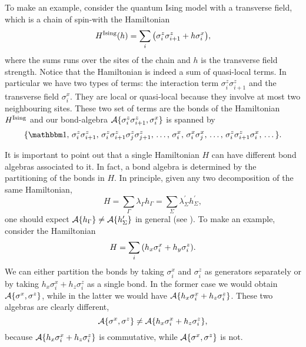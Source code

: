 To make an example, consider the quantum Ising model with a transverse field, which is a chain of spin-\onehalf with the Hamiltonian
\begin{equation}
    H^{\text{Ising}}(h) = \sum_{i} \qty( \sigma^z_i \sigma^z_{i+1} + h \sigma^x_i ),
    \label{eq:hamiltonian_ising}
\end{equation}
where the sums runs over the sites of the chain and $h$ is the transverse field strength.
Notice that the Hamiltonian is indeed a sum of quasi-local terms.
In particular we have two types of terms: the interaction term $\sigma^z_i \sigma^z_{i+1}$ and the transverse field $\sigma^x_i$.
They are local or quasi-local because they involve at most two neighbouring sites.
These two set of terms are the bonds of the Hamiltonian $H^{\text{Ising}}$ and our bond-algebra $\mathcal{A} \{\sigma^z_i \sigma^z_{i+1}, \sigma^x_i\}$ is spanned by
\begin{equation*}
    \{
        \identity, \,
        \sigma^z_i \sigma^z_{i+1}, \,
        \sigma^z_i \sigma^z_{i+1} \sigma^z_j \sigma^z_{j+1}, \,
        \dots, \,
        \sigma^x_i, \,
        \sigma^x_i \sigma^x_j, \,
        \dots, \,
        \sigma^z_i \sigma^z_{i+1} \sigma^x_i, \,
        \dots
    \}.
\end{equation*}


It is important to point out that a single Hamiltonian $H$ can have different bond algebras associated to it.
In fact, a bond algebra is determined by the partitioning of the bonds in $H$.
In principle, given any two decomposition of the same Hamiltonian,
\begin{equation*}
    H
    = \sum_{\Gamma} \lambda_{\Gamma} h_{\Gamma}
    = \sum_{\Sigma} \lambda^\prime_{\Sigma} h^\prime_{\Sigma},
\end{equation*}
one should expect $\mathcal{A}\{h_{\Gamma}\} \neq \mathcal{A}\{ h^{\prime}_{\Sigma} \}$ in general (see \cite{cobanera2011bond}).
To make an example, consider the Hamiltonian
\begin{equation*}
    H = \sum_{i} \qty( h_x \sigma^x_i + h_y \sigma^z_i ).
\end{equation*}
We can either partition the bonds by taking $\sigma^x_i$ and $\sigma^z_i$ as generators separately or by taking $h_x \sigma^x_i + h_z \sigma^z_i$ as a single bond.
In the former case we would obtain $\mathcal{A}\{\sigma^x, \sigma^z\} $, while in the latter we would have $\mathcal{A}\{h_x \sigma^x_i + h_z \sigma^z_i\}$.
These two algebras are clearly different,
\begin{equation*}
    \mathcal{A}\{\sigma^x, \sigma^z\}
    \neq
    \mathcal{A}\{h_x \sigma^x_i + h_z \sigma^z_i\},
\end{equation*}
because $\mathcal{A}\{h_x \sigma^x_i + h_z \sigma^z_i\}$ is commutative, while $\mathcal{A}\{\sigma^x, \sigma^z\} $ is not.

